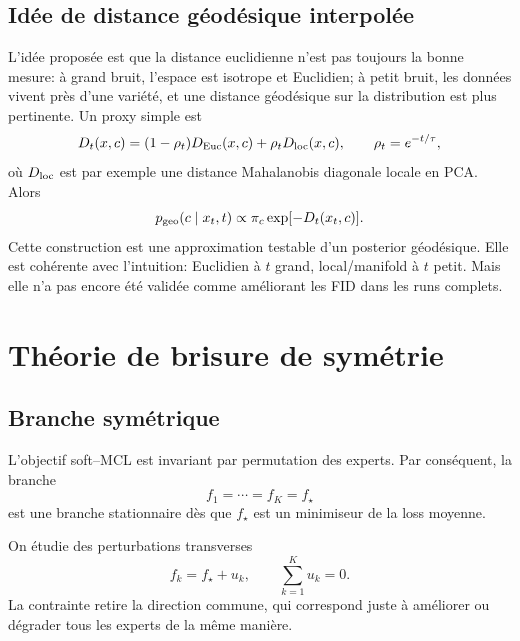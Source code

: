 \documentclass[11pt,a4paper]{article}
\newcommand{\1}{\mathbf{1}}
\newcommand{\xt}{x_t}
\begin{document}
\subsection{Idée de distance géodésique interpolée}

L'idée proposée est que la distance euclidienne n'est pas toujours la bonne mesure: à grand bruit, l'espace est isotrope et Euclidien; à petit bruit, les données vivent près d'une variété, et une distance géodésique sur la distribution est plus pertinente. Un proxy simple est
\begin{equation}
D_t(x,c)=(1-\rho_t)D_{\rm Euc}(x,c)+\rho_tD_{\rm loc}(x,c),
\qquad
\rho_t=e^{-t/\tau},
\label{eq:geodesic_proxy}
\end{equation}
où $D_{\rm loc}$ est par exemple une distance Mahalanobis diagonale locale en PCA. Alors
\begin{equation}
 p_{\rm geo}(c\mid\xt,t)\propto \pi_c\exp[-D_t(\xt,c)].
\end{equation}
Cette construction est une approximation testable d'un posterior géodésique. Elle est cohérente avec l'intuition: Euclidien à $t$ grand, local/manifold à $t$ petit. Mais elle n'a pas encore été validée comme améliorant les FID dans les runs complets.

\section{Théorie de brisure de symétrie}

\subsection{Branche symétrique}

L'objectif soft--MCL est invariant par permutation des experts. Par conséquent, la branche
\begin{equation}
f_1=\cdots=f_K=f_\star
\label{eq:symmetric_branch}
\end{equation}
est une branche stationnaire dès que $f_\star$ est un minimiseur de la loss moyenne.

On étudie des perturbations transverses
\begin{equation}
f_k=f_\star+u_k,
\qquad
\sum_{k=1}^K u_k=0.
\label{eq:transverse_pert}
\end{equation}
La contrainte retire la direction commune, qui correspond juste à améliorer ou dégrader tous les experts de la même manière.
\end{document}

